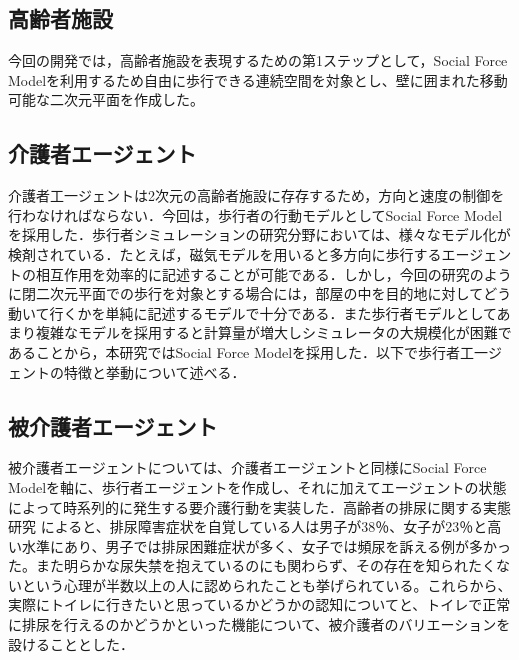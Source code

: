 \subsection{高齢者施設}

今回の開発では，高齢者施設を表現するための第1ステップとして，Social Force Modelを利用するため自由に歩行できる連続空間を対象とし、壁に囲まれた移動可能な二次元平面を作成した。

\subsection{介護者エージェント}

介護者工一ジェントは2次元の高齢者施設に存存するため，方向と速度の制御を行わなければならない．今回は，歩行者の行動モデルとしてSocial Force Modelを採用した．歩行者シミュレーションの研究分野においては、様々なモデル化が検剤されている\cite{ex_pedestrian_simulation_1,ex_pedestrian_simulation_2}．たとえば，磁気モデルを用いると多方向に歩行するエージェントの相互作用を効率的に記述することが可能である．しかし，今回の研究のように閉二次元平面での歩行を対象とする場合には，部屋の中を目的地に対してどう動いて行くかを単純に記述するモデルで十分である．また歩行者モデルとしてあまり複雑なモデルを採用すると計算量が増大しシミュレータの大規模化が困難であることから，本研究ではSocial Force Modelを採用した．以下で歩行者工一ジェントの特徴と挙動について述べる．

\subsection{被介護者エージェント}

被介護者エージェントについては、介護者エージェントと同様にSocial Force Modelを軸に、歩行者エージェントを作成し、それに加えてエージェントの状態によって時系列的に発生する要介護行動を実装した．高齢者の排尿に関する実態研究 \cite{micturition} によると、排尿障害症状を自覚している人は男子が38％、女子が23％と高い水準にあり、男子では排尿困難症状が多く、女子では頻尿を訴える例が多かった。また明らかな尿失禁を抱えているのにも関わらず、その存在を知られたくないという心理が半数以上の人に認められたことも挙げられている。これらから、実際にトイレに行きたいと思っているかどうかの認知についてと、トイレで正常に排尿を行えるのかどうかといった機能について、被介護者のバリエーションを設けることとした．
